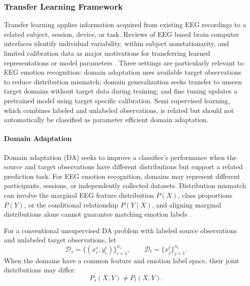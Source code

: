 \documentclass[ASNA,twocolumn]{USG}
\begin{document}
\subsubsection{Transfer Learning Framework}
\label{sec:transfer_learning_framework}

Transfer learning applies information acquired from existing EEG recordings to a related subject, session, device, or task. Reviews of EEG based brain computer interfaces identify individual variability, within subject nonstationarity, and limited calibration data as major motivations for transferring learned representations or model parameters \cite{wu2020transfer,wan2021review}. Three settings are particularly relevant to EEG emotion recognition: domain adaptation uses available target observations to reduce distribution mismatch; domain generalization seeks transfer to unseen target domains without target data during training; and fine tuning updates a pretrained model using target specific calibration. Semi supervised learning, which combines labeled and unlabeled observations, is related but should not automatically be classified as parameter efficient domain adaptation.

\paragraph{Domain Adaptation}

Domain adaptation (DA) seeks to improve a classifier's performance when the source and target observations have different distributions but support a related prediction task. For EEG emotion recognition, domains may represent different participants, sessions, or independently collected datasets. Distribution mismatch can involve the marginal EEG feature distribution $P(X)$, class proportions $P(Y)$, or the conditional relationship $P(Y\mid X)$, and aligning marginal distributions alone cannot guarantee matching emotion labels \cite{li2019domain,wan2021review}.

For a conventional unsupervised DA problem with labeled source observations and unlabeled target observations, let
\begin{equation}
\mathcal{D}_{s}=\{(x_i^s,y_i^s)\}_{i=1}^{n_s},\qquad
\mathcal{D}_{t}=\{x_j^t\}_{j=1}^{n_t}.
\label{eq:da_source_target}
\end{equation}
When the domains have a common feature and emotion label space, their joint distributions may differ:
\begin{equation}
P_s(X,Y)\neq P_t(X,Y).
\label{eq:subject_independent_domain_shift}
\end{equation}
\end{document}
